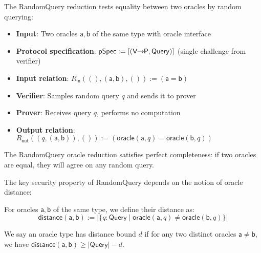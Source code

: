 \begin{definition}
    \label{def:randomquery_oracle_reduction}
    The RandomQuery reduction tests equality between two oracles by random querying:
    \begin{itemize}
        \item \textbf{Input}: Two oracles $\mathsf{a}, \mathsf{b}$ of the same type with oracle interface
        \item \textbf{Protocol specification}: $\mathsf{pSpec} := [(\mathsf{V \!\!\rightarrow\!\! P}, \mathsf{Query})]$ (single challenge from verifier)
        \item \textbf{Input relation}: $R_{\mathsf{in}}((), (\mathsf{a}, \mathsf{b}), ()) := (\mathsf{a} = \mathsf{b})$
        \item \textbf{Verifier}: Samples random query $q$ and sends it to prover
        \item \textbf{Prover}: Receives query $q$, performs no computation
        \item \textbf{Output relation}: $R_{\mathsf{out}}((q, (\mathsf{a}, \mathsf{b})), ()) := (\mathsf{oracle}(\mathsf{a}, q) = \mathsf{oracle}(\mathsf{b}, q))$
    \end{itemize}
\end{definition}

\begin{theorem}
    The RandomQuery oracle reduction satisfies perfect completeness: if two oracles are equal, they will agree on any random query.
\end{theorem}

The key security property of RandomQuery depends on the notion of oracle distance:

\begin{definition}
    \label{def:oracle_distance}
    For oracles $\mathsf{a}, \mathsf{b}$ of the same type, we define their distance as:
    \[ \mathsf{distance}(\mathsf{a}, \mathsf{b}) := |\{q : \mathsf{Query} \mid \mathsf{oracle}(\mathsf{a}, q) \neq \mathsf{oracle}(\mathsf{b}, q)\}| \]

    We say an oracle type has distance bound $d$ if for any two distinct oracles $\mathsf{a} \neq \mathsf{b}$, we have $\mathsf{distance}(\mathsf{a}, \mathsf{b}) \geq |\mathsf{Query}| - d$.
\end{definition}

